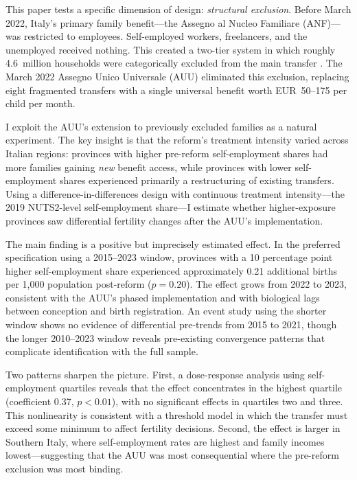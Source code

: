 \documentclass[12pt]{article}
\begin{document}
This paper tests a specific dimension of design: \textit{structural exclusion}. Before March 2022, Italy's primary family benefit---the Assegno al Nucleo Familiare (ANF)---was restricted to employees. Self-employed workers, freelancers, and the unemployed received nothing. This created a two-tier system in which roughly 4.6~million households were categorically excluded from the main transfer \citep{inps2022auu}. The March 2022 Assegno Unico Universale (AUU) eliminated this exclusion, replacing eight fragmented transfers with a single universal benefit worth EUR~50--175 per child per month.

I exploit the AUU's extension to previously excluded families as a natural experiment. The key insight is that the reform's treatment intensity varied across Italian regions: provinces with higher pre-reform self-employment shares had more families gaining \textit{new} benefit access, while provinces with lower self-employment shares experienced primarily a restructuring of existing transfers. Using a difference-in-differences design with continuous treatment intensity---the 2019 NUTS2-level self-employment share---I estimate whether higher-exposure provinces saw differential fertility changes after the AUU's implementation.

The main finding is a positive but imprecisely estimated effect. In the preferred specification using a 2015--2023 window, provinces with a 10 percentage point higher self-employment share experienced approximately 0.21 additional births per 1,000 population post-reform ($p = 0.20$). The effect grows from 2022 to 2023, consistent with the AUU's phased implementation and with biological lags between conception and birth registration. An event study using the shorter window shows no evidence of differential pre-trends from 2015 to 2021, though the longer 2010--2023 window reveals pre-existing convergence patterns that complicate identification with the full sample.

Two patterns sharpen the picture. First, a dose-response analysis using self-employment quartiles reveals that the effect concentrates in the highest quartile (coefficient 0.37, $p < 0.01$), with no significant effects in quartiles two and three. This nonlinearity is consistent with a threshold model in which the transfer must exceed some minimum to affect fertility decisions. Second, the effect is larger in Southern Italy, where self-employment rates are highest and family incomes lowest---suggesting that the AUU was most consequential where the pre-reform exclusion was most binding.
\end{document}

